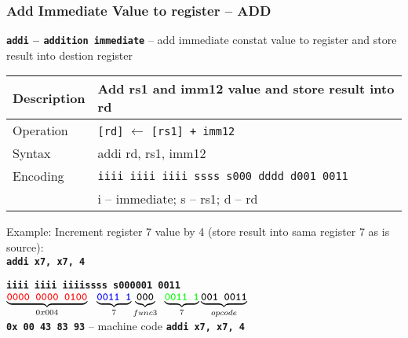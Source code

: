 \documentclass{beamer}
\begin{document}
\begin{frame}
\frametitle{Add Immediate Value to register -- ADD}

\textbf{\texttt{addi} -- \texttt{addition immediate}} -- add immediate constat value to register and store result into destion register

\bigskip

\begin{tabular}{|l|l|}\hline
Description & Add rs1 and imm12 value and store result into rd \\ \hline
Operation& \texttt{[rd]} $\leftarrow$ \texttt{[rs1] + imm12} \\ \hline
Syntax & addi rd, rs1, imm12 \\ \hline
Encoding & \texttt{iiii iiii iiii ssss s000 dddd d001 0011} \\
 & i -- immediate; s -- rs1; d -- rd \\ \hline
\end{tabular}

\bigskip

Example: Increment register 7 value by 4 (store result into sama register 7 as is source):\\
\textbf{\texttt{addi x7, x7, 4}}

\textbf{\texttt{\color{red}iiii iiii iiii}}\phantom{xx}\textbf{\texttt{\color{blue}ssss s}}\hspace{0.1cm}\textbf{\texttt{000\hspace{0.05cm}001 0011}}\\
$\underbrace{\textbf{\texttt{\color{red}0000 0000 0100}}}_{0x004}\texttt{ }\underbrace{\textbf{\texttt{\color{blue}0011 1}}}_{7}\underbrace{\textbf{\texttt{000}}}_{func3}\phantom{i}\underbrace{\textbf{\texttt{\color{green}0011 1}}}_{7}\underbrace{\textbf{\texttt{001 0011}}}_{opcode}$\\

\textbf{\texttt{0x 00 43 83 93}} -- machine code \textbf{\texttt{addi x7, x7, 4}}


\end{frame}
\end{document}
